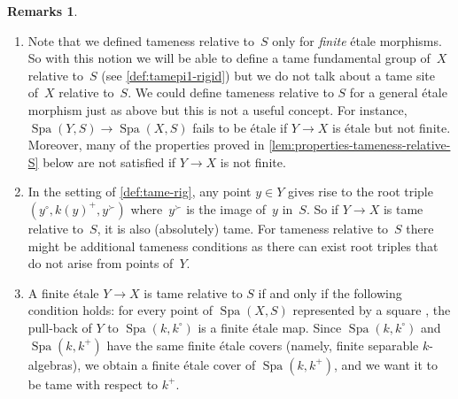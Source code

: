 \documentclass[a4paper,twoside,11pt,reqno]{amsart}
\DeclareMathOperator{\Spa}{Spa}
\theoremstyle{definition}
\newtheorem{rmks}[thm]{Remarks}
\numberwithin{equation}{subsection}
\begin{document}
\begin{rmks} \label{rmks:relative-tameness}
    \begin{enumerate}[(1)]
        \item Note that we defined tameness relative to~$S$ only for \emph{finite} étale morphisms. So with this notion we will be able to define a tame fundamental group of~$X$ relative to~$S$ (see \cref{def:tamepi1-rigid}) but we do not talk about a tame site of~$X$ relative to~$S$. We could define tameness relative to $S$ for a general étale morphism just as above but this is not a useful concept. For instance, $\Spa(Y,S) \to \Spa(X,S)$ fails to be étale if $Y \to X$ is étale but not finite. Moreover, many of the properties proved in \cref{lem:properties-tameness-relative-S} below are not satisfied if $Y\to X$ is not finite. 
        \item In the setting of \cref{def:tame-rig}, any point $y \in Y$ gives rise to the root triple $(y^\circ,k(y)^+,y^\succ)$ where~$y^\succ$ is the image of~$y$ in~$S$. So if $Y \to X$ is tame relative to~$S$, it is also (absolutely) tame. For tameness relative to~$S$ there might be additional tameness conditions as there can exist root triples that do not arise from points of~$Y$. 
        \item \label{enumitem:relative-tameness-test-square} A finite \'etale $Y\to X$ is tame relative to $S$ if and only if the following condition holds: for every point of $\Spa(X, S)$ represented by a square , the pull-back of $Y$ to $\Spa(k, k^\circ)$ is a finite \'etale map. Since $\Spa(k, k^\circ)$ and $\Spa(k, k^+)$ have the same finite \'etale covers (namely, finite separable $k$-algebras), we obtain a finite \'etale cover of $\Spa(k, k^+)$, and we want it to be tame with respect to $k^+$. 
    \end{enumerate}
\end{rmks}
\end{document}
